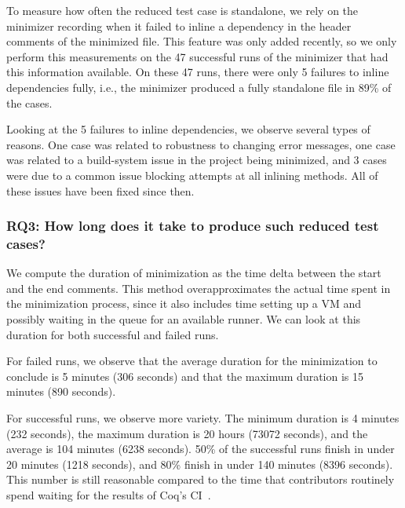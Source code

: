 \documentclass[a4paper,USenglish,cleveref,autoref,thm-restate]{lipics-v2021}
\begin{document}
To measure how often the reduced test case is standalone, we rely on the minimizer recording when it failed to inline a dependency in the header comments of the minimized file. This feature was only added recently, so we only perform this measurements on the 47 successful runs of the minimizer that had this information available.
On these 47 runs, there were only 5 failures to inline dependencies fully, i.e., the minimizer produced a fully standalone file in 89\% of the cases.

Looking at the 5 failures to inline dependencies, we observe several types of reasons. One case was related to robustness to changing error messages, one case was related to a build-system issue in the project being minimized, and 3 cases were due to a common issue blocking attempts at all inlining methods. All of these issues have been fixed since then.

\subsubsection{RQ3: How long does it take to produce such reduced test cases?}

We compute the duration of minimization as the time delta between the start and the end comments.
This method overapproximates the actual time spent in the minimization process, since it also includes time setting up a VM and possibly waiting in the queue for an available runner.
%
We can look at this duration for both successful and failed runs.

For failed runs, we observe that the average duration for the minimization to conclude is 5 minutes (306 seconds) and that the maximum duration is 15 minutes (890 seconds).

For successful runs, we observe more variety. The minimum duration is 4 minutes (232 seconds), the maximum duration is 20 hours (73072 seconds), and the average is 104 minutes (6238 seconds). 50\% of the successful runs finish in under 20 minutes (1218 seconds), and 80\% finish in under 140 minutes (8396 seconds). This number is still reasonable compared to the time that contributors routinely spend waiting for the results of Coq's CI~\cite{zimmermann:tel-02451322}.
\end{document}
